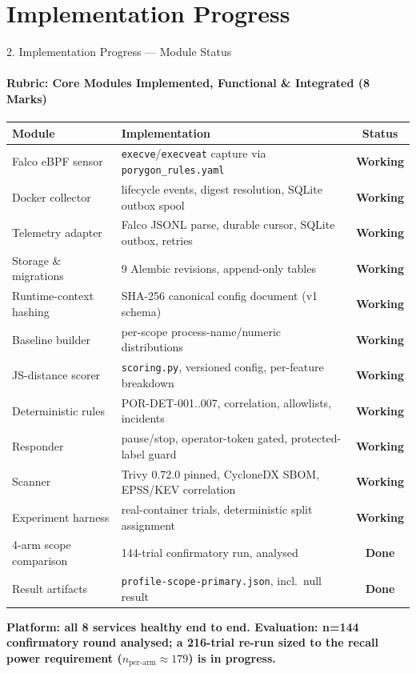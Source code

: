 \documentclass[aspectratio=169, 11pt]{beamer}
\newcommand{\ok}[1]{\textcolor{goodGreen}{\textbf{#1}}}
\begin{document}
\section{Implementation Progress}
\begin{frame}{2. Implementation Progress --- Module Status}
\framesubtitle{Rubric: Core Modules Implemented, Functional \& Integrated (8 Marks)}

\centering
\begin{table}
\tiny
\renewcommand{\arraystretch}{0.92}
\begin{tabular}{p{3.1cm} p{6.3cm} c}
\toprule
\textbf{Module} & \textbf{Implementation} & \textbf{Status} \\
\midrule
Falco eBPF sensor & \texttt{execve}/\texttt{execveat} capture via \texttt{porygon\_rules.yaml} & \ok{Working} \\
Docker collector & lifecycle events, digest resolution, SQLite outbox spool & \ok{Working} \\
Telemetry adapter & Falco JSONL parse, durable cursor, SQLite outbox, retries & \ok{Working} \\
Storage \& migrations & 9 Alembic revisions, append-only tables & \ok{Working} \\
Runtime-context hashing & SHA-256 canonical config document (v1 schema) & \ok{Working} \\
Baseline builder & per-scope process-name/numeric distributions & \ok{Working} \\
JS-distance scorer & \texttt{scoring.py}, versioned config, per-feature breakdown & \ok{Working} \\
Deterministic rules & POR-DET-001..007, correlation, allowlists, incidents & \ok{Working} \\
Responder & pause/stop, operator-token gated, protected-label guard & \ok{Working} \\
Scanner & Trivy 0.72.0 pinned, CycloneDX SBOM, EPSS/KEV correlation & \ok{Working} \\
Experiment harness & real-container trials, deterministic split assignment & \ok{Working} \\
\midrule
4-arm scope comparison & 144-trial confirmatory run, analysed & \ok{Done} \\
Result artifacts & \texttt{profile-scope-primary.json}, incl.\ null result & \ok{Done} \\
\bottomrule
\end{tabular}
\end{table}

{\scriptsize \textbf{Platform: all 8 services healthy end to end.
Evaluation: n=144 confirmatory round analysed; a 216-trial re-run sized to
the recall power requirement ($n_{\text{per-arm}}\approx179$) is in
progress.}}
\end{frame}
\end{document}
